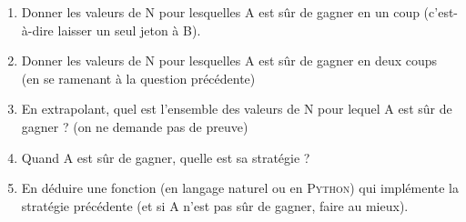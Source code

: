\documentclass[a4paper,12pt]{article}
\begin{document}

\begin{enumerate}[\bfseries 1.]
	\item 	Donner les valeurs de N pour lesquelles A est sûr de gagner en un coup (c'est-à-dire laisser un seul jeton à B).
	\item 	Donner les valeurs de N pour lesquelles A est sûr de gagner en deux coups (en se ramenant à la question précédente)
	\item 	En extrapolant, quel est l'ensemble des valeurs de N pour lequel A est sûr de gagner ? (on ne demande pas de preuve)
	\item 	Quand A est sûr de gagner, quelle est sa stratégie ?
	\item 	En déduire une fonction (en langage naturel ou en \textsc{Python})  qui implémente la stratégie précédente (et si A n'est pas sûr de gagner, faire au mieux).
\end{enumerate}
\end{document}
